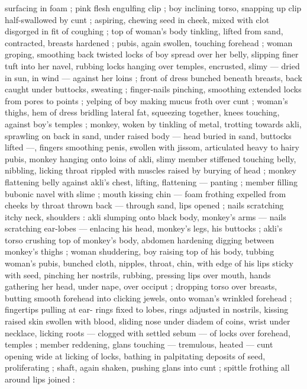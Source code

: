 surfacing in foam ; pink flesh engulfing clip ; boy inclining torso, 
snapping up clip half-swallowed by cunt ; aspiring, chewing seed in 
cheek, mixed with clot disgorged in fit of coughing ; top of woman's 
body tinkling, lifted from sand, contracted, breasts hardened ; pubis, 
again swollen, touching forehead ; woman groping, smoothing back 
twisted locks of boy spread over her belly, slipping finer tuft into her 
navel, rubbing locks hanging over temples, encrusted, slimy --- dried 
in sun, in wind --- against her loins ; front of dress bunched beneath 
breasts, back caught under buttocks, sweating ; finger-nails pinching, 
smoothing extended locks from pores to points ; yelping of boy 
making mucus froth over cunt ; woman's thighs, hem of dress 
bridling lateral fat, squeezing together, knees touching, against 
boy's temples ; monkey, woken by tinkling of metal, trotting towards 
akli, sprawling on back in sand, under raised body --- head buried in 
sand, buttocks lifted ---, fingers smoothing penis, swollen with 
jissom, articulated heavy to hairy pubis, monkey hanging onto loins 
of akli, slimy member stiffened touching belly, nibbling, licking throat 
rippled with muscles raised by burying of head ; monkey flattening 
belly against akli's chest, lifting, flattening --- panting ; member 
filling bubonic navel with slime ; mouth kissing chin --- foam frothing 
expelled from cheeks by throat thrown back --- through sand, lips 
opened ; nails scratching itchy neck, shoulders : akli slumping onto 
black body, monkey's arms --- nails scratching ear-lobes --- enlacing 
his head, monkey's legs, his buttocks ; akli's torso crushing top of 
monkey's body, abdomen hardening digging between monkey's 
thighs ; woman shuddering, boy raising top of his body, tubbing 
woman's pubis, bunched cloth, nipples, throat, chin, with edge of his 
lips sticky with seed, pinching her nostrils, rubbing, pressing lips 
over mouth, hands gathering her head, under nape, over occiput ; 
dropping torso over breasts, butting smooth forehead into clicking 
jewels, onto woman's wrinkled forehead ; fingertips pulling at ear- 
rings fixed to lobes, rings adjusted in nostrils, kissing raised skin 
swollen with blood, sliding nose under diadem of coins, wrist under 
necklace, licking roots --- clogged with settled sebum --- of locks 
over forehead, temples ; member reddening, glans touching --- 
tremulous, heated --- cunt opening wide at licking of locks, bathing 
in palpitating deposits of seed, proliferating ; shaft, again shaken, 
pushing glans into cunt ; spittle frothing all around lips joined : 
